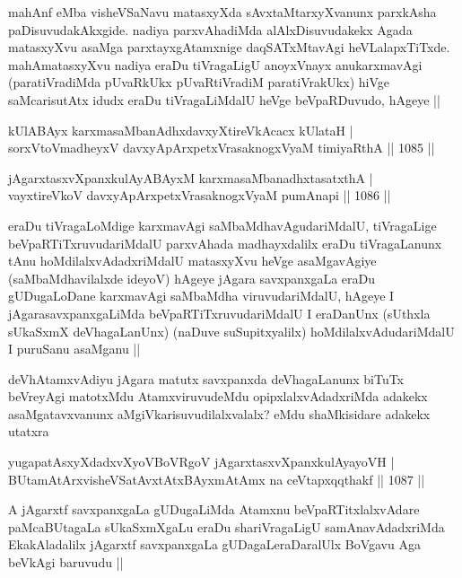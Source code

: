 \begin{artha}
mahAnf eMba visheVSaNavu matasxyXda sAvxtaMtarxyXvanunx parxkAsha paDisuvudakAkxgide. nadiya parxvAhadiMda alAlxDisuvudakekx Agada matasxyXvu asaMga parxtayxgAtamxnige daqSATxMtavAgi heVLalapxTiTxde. mahAmatasxyXvu nadiya eraDu tiVragaLigU anoyxVnayx anukarxmavAgi (paratiVradiMda pUvaRkUkx pUvaRtiVradiM paratiVrakUkx) hiVge saMcarisutAtx idudx eraDu tiVragaLiMdalU heVge beVpaRDuvudo, hAgeye ||
\end{artha}


\begin{shl}
kUlABAyx karxmasaMbanAdhxdavxyXtireVkAcacx kUlataH | \\
sorxVtoVmadheyxV davxyApArxpetxVrasaknogxV\s yaM timiyaRthA \hfill||  1085 ||  
\end{shl}
				
\begin{shl}
jAgarxtasxvXpanxkulAyABAyxM karxmasaMbanadhxtasatxthA | \\
vayxtireVkoV davxyApArxpetxVrasaknogxV\s yaM pumAnapi \hfill||  1086 || 
\end{shl}

\begin{artha}
eraDu tiVragaLoMdige karxmavAgi saMbaMdhavAgudariMdalU, tiVragaLige beVpaRTiTxruvudariMdalU parxvAhada madhayxdalilx eraDu tiVragaLanunx tAnu hoMdilalxvAdadxriMdalU matasxyXvu heVge asaMgavAgiye (saMbaMdhavilalxde ideyoV) hAgeye jAgara savxpanxgaLa eraDu gUDugaLoDane karxmavAgi saMbaMdha viruvudariMdalU, hAgeye I jAgarasavxpanxgaLiMda beVpaRTiTxruvudariMdalU I eraDanUnx (sUthxla sUkaSxmX deVhagaLanUnx) (naDuve suSupitxyalilx) hoMdilalxvAdudariMdalU I puruSanu asaMganu ||
\end{artha}

\begin{artha}
deVhAtamxvAdiyu jAgara matutx savxpanxda deVhagaLanunx biTuTx beVreyAgi matotxMdu AtamxviruvudeMdu opipxlalxvAdadxriMda adakekx asaMgatavxvanunx aMgiVkarisuvudilalxvalalx? eMdu shaMkisidare adakekx utatxra
\end{artha}

\begin{shl}
yugapatAsxyXdadxvXyoVBoVRgoV jAgarxtasxvXpanxkulAyayoVH | \\
BUtamAtArxvisheVSatAvxtAtxBAyxmAtAmx na ceVtapxqqthakf \hfill||  1087 ||  
\end{shl}

\begin{artha}
A jAgarxtf savxpanxgaLa gUDugaLiMda Atamxnu beVpaRTitxlalxvAdare paMcaBUtagaLa sUkaSxmXgaLu eraDu shariVragaLigU samAnavAdadxriMda EkakAladalilx jAgarxtf savxpanxgaLa gUDagaLeraDaralUlx BoVgavu Aga beVkAgi baruvudu ||
\end{artha}

